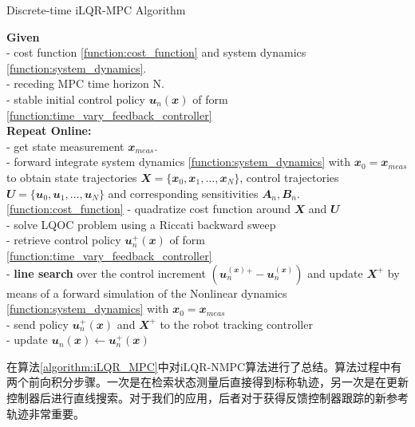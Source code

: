 \begin{algorithm}
    
    \caption[short]{Discrete-time iLQR-MPC Algorithm}
    \label{algorithm:iLQR_MPC}
    \textbf{Given}\\
    - cost function \eqref{function:cost_function} and system dynamics \eqref{function:system_dynamics}.\\
    - receding MPC time horizon N.\\
    - stable initial control policy $\mathbfit{u}_n(\mathbfit{x})$ of form \eqref{function:time_vary_feedback_controller}\\
    \textbf{Repeat Online:}\\
    - get state measurement $\mathbfit{x}_{meas}$.\\
    - forward integrate system dynamics \eqref{function:system_dynamics} with $\mathbfit{x}_0=\mathbfit{x}_{meas}$ to obtain state trajectories $\mathbfit{X}=\{\mathbfit{x}_0, \mathbfit{x}_1, \dots, \mathbfit{x}_N\}$, control trajectories $\mathbfit{U}=\{\mathbfit{u}_0, \mathbfit{u}_1, \dots, \mathbfit{u}_N\}$ and corresponding sensitivities $\mathbfit{A}_n, \mathbfit{B}_n$.\\\eqref{function:cost_function}
    - quadratize cost function around $\mathbfit{X}$ and $\mathbfit{U}$\\
    - solve LQOC problem using a Riccati backward sweep\\
    - retrieve control policy $\mathbfit{u}_n^+(\mathbfit{x})$ of form \eqref{function:time_vary_feedback_controller}\\
    - \textbf{line search} over the control increment $(\mathbfit{u}_n^(\mathbfit{x})^+-\mathbfit{u}_n^(\mathbfit{x}))$ and update $\mathbfit{X}^+$ by means of a forward simulation of the Nonlinear dynamics \eqref{function:system_dynamics} with $\mathbfit{x}_0=\mathbfit{x}_{meas}$\\
    - send policy $\mathbfit{u}_n^+(\mathbfit{x})$ and $\mathbfit{X}^+$ to the robot tracking controller\\
    - update $\mathbfit{u}_n(\mathbfit{x})\leftarrow\mathbfit{u}_n^+(\mathbfit{x})$
\end{algorithm}

在算法\ref{algorithm:iLQR_MPC}中对iLQR-NMPC算法进行了总结。算法过程中有两个前向积分步骤。一次是在检索状态测量后直接得到标称轨迹，另一次是在更新控制器后进行直线搜索。对于我们的应用，后者对于获得反馈控制器跟踪的新参考轨迹非常重要。


